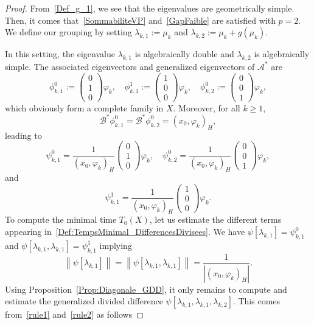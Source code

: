 \documentclass[11pt]{article}
\theoremstyle{definition}
\numberwithin{equation}{section}
\numberwithin{figure}{section}
\numberwithin{table}{section}
\newcommand\As{\mathcal{A}^*}
\newcommand\Bs{\mathcal{B}^*}
\newcommand{\normeX}[1]{\left\| #1 \right\|}
\newcommand{\psH}[2]{\left(#1, #2 \right)_H}
\begin{document}
\begin{proof}
From~\eqref{Def_g_1}, we see that the eigenvalues are geometrically simple. Then, it comes that~\eqref{SommabiliteVP} and~\eqref{GapFaible} are satisfied with $p=2$. We define our grouping by setting $\lambda_{k,1}:=\mu_k$ and $\lambda_{k,2}:=\mu_k+g(\mu_k)$.

In this setting, the eigenvalue $\lambda_{k,1}$ is algebraically double and $\lambda_{k,2}$ is algebraically simple. The associated eigenvectors and generalized eigenvectors of $\As$ are
\[
\phi_{k,1}^0 :=
\begin{pmatrix} 0 \\1\\0
\end{pmatrix} \varphi_k, \quad
\phi_{k,1}^1 :=
\begin{pmatrix} 1\\0\\0
\end{pmatrix} \varphi_k, \quad
\phi_{k,2}^0 :=
\begin{pmatrix} 0\\0\\1
\end{pmatrix} \varphi_k,
\]
which obviously form a complete family in $X$. Moreover, for all $k \geq 1$,
\[
\Bs \phi_{k,1}^0= \Bs \phi_{k,2}^0= \psH{x_0}{\varphi_k},
\]
leading to
\[
\psi_{k,1}^0 = \frac{1}{\psH{x_0}{\varphi_k}}
\begin{pmatrix} 0 \\1\\0
\end{pmatrix} \varphi_k,
\quad
\psi_{k,2}^0 = \frac{1}{\psH{x_0}{\varphi_k}}
\begin{pmatrix} 0\\0\\1
\end{pmatrix} \varphi_k,
\]
and
\[
\psi_{k,1}^1 = \frac{1}{\psH{x_0}{\varphi_k}}
\begin{pmatrix} 1\\0\\0
\end{pmatrix} \varphi_k.
\]
To compute the minimal time $T_0(X)$, let us estimate the different terms appearing in~\eqref{Def:TempsMinimal_DifferencesDivisees}. We have $\psi[\lambda_{k,1}]=\psi_{k,1}^0$ and $\psi[\lambda_{k,1}, \lambda_{k,1}] = \psi_{k,1}^1$ implying
\[
\normeX{\psi[\lambda_{k,1}]} = \normeX{\psi[\lambda_{k,1}, \lambda_{k,1}]} =\frac 1{ | \psH{x_0}{\varphi_k}|}.
\]
Using Proposition~\ref{Prop:Diagonale_GDD}, it only remains to compute and estimate the generalized divided difference $\psi[\lambda_{k,1},\lambda_{k,1},\lambda_{k,2}]$. This comes from~\eqref{rule1} and~\eqref{rule2} as follows

\end{proof}
\end{document}
